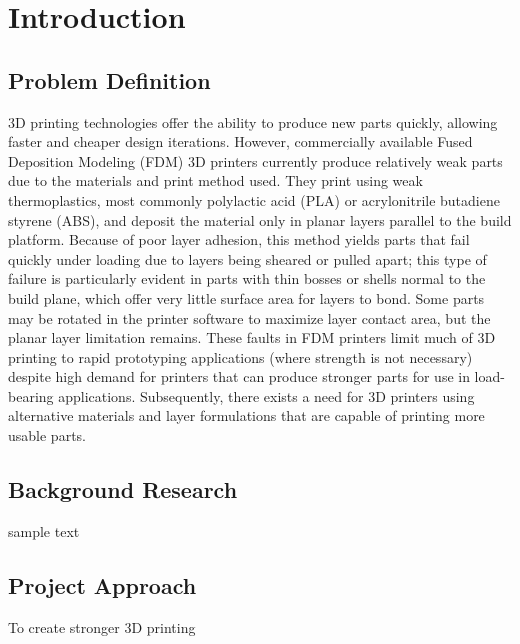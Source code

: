 \section{Introduction}

\subsection{Problem Definition}

\indent

3D printing technologies offer the ability to produce new parts quickly, allowing faster and cheaper design iterations. However, commercially available Fused Deposition Modeling (FDM) 3D printers currently produce relatively weak parts due to the materials and print method used. They print using weak thermoplastics, most commonly polylactic acid (PLA) or acrylonitrile butadiene styrene (ABS), and deposit the material only in planar layers parallel to the build platform. Because of poor layer adhesion, this method yields parts that fail quickly under loading due to layers being sheared or pulled apart; this type of failure is particularly evident in parts with thin bosses or shells normal to the build plane, which offer very little surface area for layers to bond. Some parts may be rotated in the printer software to maximize layer contact area, but the planar layer limitation remains. These faults in FDM printers limit much of 3D printing to rapid prototyping applications (where strength is not necessary) despite high demand for printers that can produce stronger parts for use in load-bearing applications. Subsequently, there exists a need for 3D printers using alternative materials and layer formulations that are capable of printing more usable parts.\\

\subsection{Background Research}

\indent

sample text

\subsection{Project Approach}

\indent

To create stronger 3D printing

